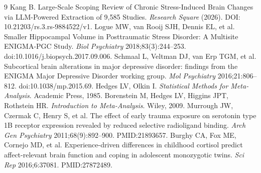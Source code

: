 \documentclass[11pt]{article}
\begin{document}
\begin{thebibliography}{9}
 Kang B. Large-Scale Scoping Review of Chronic
Stress-Induced Brain Changes via LLM-Powered Extraction of 9,585 Studies. {\it
Research Square} (2026). DOI: 10.21203/rs.3.rs-9884522/v1.
 Logue MW, van Rooij SJH, Dennis EL, et al. Smaller
Hippocampal Volume in Posttraumatic Stress Disorder: A Multisite ENIGMA-PGC
Study. {\it Biol Psychiatry} 2018;83(3):244--253.
doi:10.1016/j.biopsych.2017.09.006.
 Schmaal L, Veltman DJ, van Erp TGM, et al. Subcortical
brain alterations in major depressive disorder: findings from the ENIGMA Major
Depressive Disorder working group. {\it Mol Psychiatry} 2016;21:806--812.
doi:10.1038/mp.2015.69.
 Hedges LV, Olkin I. {\it Statistical Methods for
Meta-Analysis}. Academic Press, 1985.
 Borenstein M, Hedges LV, Higgins JPT, Rothstein HR.
{\it Introduction to Meta-Analysis}. Wiley, 2009.
 Murrough JW, Czermak C, Henry S, et al. The effect of
early trauma exposure on serotonin type 1B receptor expression revealed by
reduced selective radioligand binding. {\it Arch Gen Psychiatry}
2011;68(9):892--900. PMID:21893657.
 Burghy CA, Fox ME, Cornejo MD, et al. Experience-driven
differences in childhood cortisol predict affect-relevant brain function and
coping in adolescent monozygotic twins. {\it Sci Rep} 2016;6:37081.
PMID:27872489.
\end{thebibliography}
\end{document}
